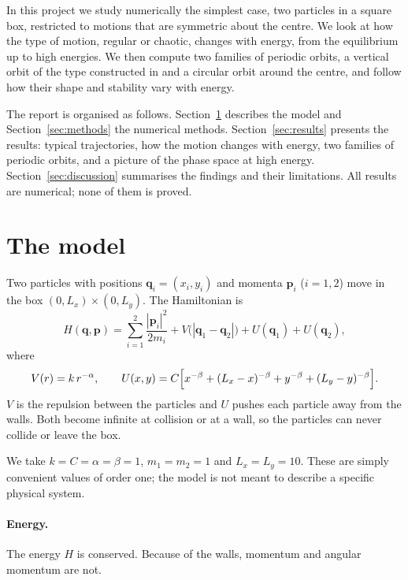 \documentclass[11pt,a4paper]{article}
\newcommand{\q}{\mathbf{q}}
\newcommand{\p}{\mathbf{p}}
\begin{document}
In this project we study numerically the simplest case, two particles in a
square box, restricted to motions that are symmetric about the centre. We look
at how the type of motion, regular or chaotic, changes with energy, from the
equilibrium up to high energies. We then compute two families of periodic
orbits, a vertical orbit of the type constructed in \cite{turaev2022} and a
circular orbit around the centre, and follow how their shape and stability
vary with energy.

The report is organised as follows. Section~\ref{sec:model} describes the
model and Section~\ref{sec:methods} the numerical methods.
Section~\ref{sec:results} presents the results: typical trajectories, how the
motion changes with energy, two families of periodic orbits, and a picture of
the phase space at high energy. Section~\ref{sec:discussion} summarises the
findings and their limitations. All results are numerical; none of them is
proved.

\section{The model}\label{sec:model}

Two particles with positions $\q_i=(x_i,y_i)$ and momenta $\p_i$ ($i=1,2$)
move in the box $(0,L_x)\times(0,L_y)$. The Hamiltonian is
\begin{equation}\label{eq:H}
  H(\q,\p)=\sum_{i=1}^{2}\frac{|\p_i|^2}{2m_i}
  + V\bigl(|\q_1-\q_2|\bigr) + U(\q_1) + U(\q_2),
\end{equation}
where
\begin{equation}\label{eq:potentials}
  V(r)=k\,r^{-\alpha},\qquad
  U(x,y)=C\Bigl[x^{-\beta}+(L_x-x)^{-\beta}+y^{-\beta}+(L_y-y)^{-\beta}\Bigr].
\end{equation}
$V$ is the repulsion between the particles and $U$ pushes each particle away
from the walls. Both become infinite at collision or at a wall, so the
particles can never collide or leave the box.

We take $k=C=\alpha=\beta=1$, $m_1=m_2=1$ and $L_x=L_y=10$. These are simply
convenient values of order one; the model is not meant to describe a specific
physical system.

\paragraph{Energy.} The energy $H$ is conserved. Because of the walls,
momentum and angular momentum are not.
\end{document}
